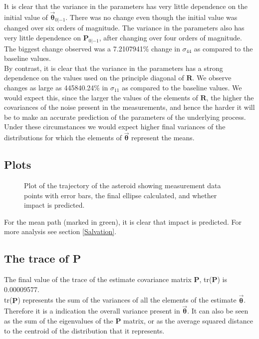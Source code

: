 \documentclass[a4paper]{article}
\begin{document}
	\noindent It is clear that the variance in the parameters has very little dependence on the initial value of $\bm{\vec{\theta}}_{0|-1}$. There was no change even though the initial value was changed over six orders of magnitude. The variance in the parameters also has very little dependence on $\bm{P}_{0|-1}$, after changing over four orders of magnitude. The biggest change observed was a 7.2107941\% change in $\sigma_{44}$ as compared to the baseline values.\\
	
	By contrast, it is clear that the variance in the parameters has a strong dependence on the values used on the principle diagonal of $\bm{R}$. We observe changes as large as 445840.24\% in $\sigma_{11}$ as compared to the baseline values. We would expect this, since the larger the values of the elements of $\bm{R}$, the higher the covariances of the noise present in the measurements, and hence the harder it will be to make an accurate prediction of the parameters of the underlying process. Under these circumstances we would expect higher final variances of the distributions for which the elements of $\bm{\vec{\theta}}$ represent the means.

	\clearpage
	\subsection{Plots}\label{Plots}
	\begin{figure}[ht!]
		\centering
		
		\caption{Plot of the trajectory of the asteroid showing measurement data points with error bars, the final ellipse calculated, and whether impact is predicted.}\label{Fig_traj}
	\end{figure}
	\noindent For the mean path (marked in green), it is clear that impact is predicted. For more analysis see section \ref{Salvation}.
	
	\clearpage
	\subsection{The trace of P}\label{Trace_of_P}
	The final value of the trace of the estimate covariance matrix $\bm{P}$, tr($\bm{P}$) is 0.00009577.\\
	
	tr($\bm{P}$) represents the sum of the variances of all the elements of the estimate $\bm{\vec{\theta}}$. Therefore it is a indication the overall variance present in $\bm{\vec{\theta}}$. It can also be seen as the sum of the eigenvalues of the $\bm{P}$ matrix\cite{Wiki_trace}, or as the average squared distance to the centroid of the distribution that it represents\cite{Stack_exch__trace}.\\
	
\end{document}
